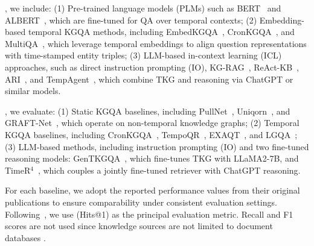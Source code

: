 , we include:
(1) Pre-trained language models (PLMs) such as BERT~\cite{devlin2019bert} and ALBERT~\cite{lan2019albert}, which are fine-tuned for QA over temporal contexts;
(2) Embedding-based temporal KGQA methods, including EmbedKGQA~\cite{saxena2020improving}, CronKGQA~\cite{saxena2021question}, and MultiQA~\cite{chen2023multi}, which leverage temporal embeddings to align question representations with time-stamped entity triples;
(3) LLM-based in-context learning (ICL) approaches, such as direct instruction prompting (IO), KG-RAG~\cite{ARI}, ReAct-KB~\cite{yao2022react,ARI}, ARI~\cite{ARI}, and TempAgent~\cite{qianyihu-etal-2025-time}, which combine TKG and reasoning via ChatGPT or similar models.

, we evaluate:
(1) Static KGQA baselines, including PullNet~\cite{sun2019pullnet}, Uniqorn~\cite{pramanik2024uniqorn}, and GRAFT-Net~\cite{sun2018open}, which operate on non-temporal knowledge graphs;
(2) Temporal KGQA baselines, including CronKGQA~\cite{saxena2021question}, TempoQR~\cite{mavromatis2022tempoqr}, EXAQT~\cite{jia2021complex}, and LGQA~\cite{liu2023local};
(3) LLM-based methods, including instruction prompting (IO) and two fine-tuned reasoning models: GenTKGQA~\cite{gao2024two}, which fine-tunes TKG with LLaMA2-7B, and TimeR$^4$~\cite{T4}, which couples a jointly fine-tuned retriever with ChatGPT reasoning.

For each baseline, we adopt the reported performance values from their original publications to ensure comparability under consistent evaluation settings. 
Following~\cite{tog1.0sun2023think, tog2.0ma2024think, pogtan2025paths}, we use  (Hits@1) as the principal evaluation metric. 
Recall and F1 scores are not used since knowledge sources are not limited to
document databases \cite{tog1.0sun2023think, tog2.0ma2024think}.

